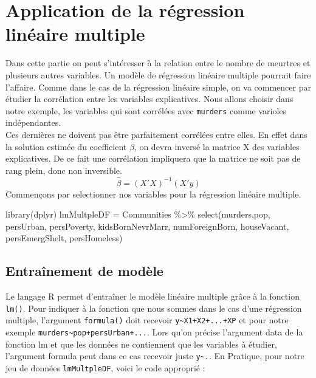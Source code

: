 \documentclass[
]{book}
\newenvironment{Shaded}{\begin{snugshade}}{\end{snugshade}}
\newcommand{\FunctionTok}[1]{\textcolor[rgb]{0.00,0.00,0.00}{#1}}
\newcommand{\NormalTok}[1]{#1}
\newcommand{\OtherTok}[1]{\textcolor[rgb]{0.56,0.35,0.01}{#1}}
\newcommand{\SpecialCharTok}[1]{\textcolor[rgb]{0.00,0.00,0.00}{#1}}
\begin{document}
\hypertarget{application-de-la-ruxe9gression-linuxe9aire-multiple}{%
\section{Application de la régression linéaire multiple}\label{application-de-la-ruxe9gression-linuxe9aire-multiple}}

Dans cette partie on peut s'intéresser à la relation entre le nombre de meurtres et plusieurs autres variables. Un modèle de régression linéaire multiple pourrait faire l'affaire. Comme dans le cas de la régression linéaire simple, on va commencer par étudier la corrélation entre les variables explicatives. Nous allons choisir dans notre exemple, les variables qui sont corrélées avec \texttt{murders} comme varioles indépendantes.\\
Ces dernières ne doivent pas être parfaitement corrélées entre elles. En effet dans la solution estimée du coefficient \(\beta\), on devra inversé la matrice X des variables explicatives. De ce fait une corrélation impliquera que la matrice ne soit pas de rang plein, donc non inversible.
\[\hat\beta = (X'X)^{-1}(X'y)\]
Commençons par selectionner nos variables pour la régression linéaire multiple.

\begin{Shaded}
\begin{Highlighting}[]
\FunctionTok{library}\NormalTok{(dplyr)}
\NormalTok{lmMultpleDF }\OtherTok{=}\NormalTok{ Communities }\SpecialCharTok{\%\textgreater{}\%} \FunctionTok{select}\NormalTok{(murders,pop, persUrban, persPoverty,}
\NormalTok{                           kidsBornNevrMarr, numForeignBorn,}
\NormalTok{                           houseVacant, persEmergShelt, persHomeless)}
\end{Highlighting}
\end{Shaded}

\hypertarget{entrauxeenement-de-moduxe8le}{%
\subsection*{Entraînement de modèle}\label{entrauxeenement-de-moduxe8le}}

Le langage R permet d'entraîner le modèle linéaire multiple grâce à la fonction \texttt{lm()}. Pour indiquer à la fonction que nous sommes dans le cas d'une régression multiple, l'argument \texttt{formula()} doit recevoir \texttt{y\textasciitilde{}X1+X2+...+XP} et pour notre exemple \texttt{murders\textasciitilde{}pop+persUrban+...}.
Lors qu'on précise l'argument data de la fonction lm et que les données ne contiennent que les variables à étudier, l'argument formula peut dans ce cas recevoir juste \texttt{y\textasciitilde{}.}. En Pratique, pour notre jeu de données \texttt{lmMultpleDF}, voici le code approprié :
\end{document}
